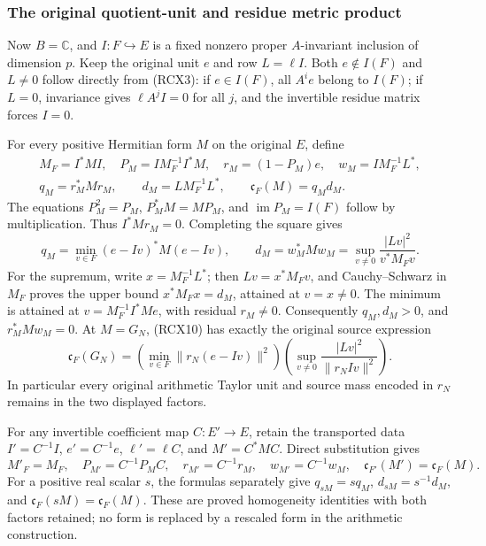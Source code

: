 \subsubsection{The original quotient-unit and residue metric product}

Now \(B=\mathbb C\), and \(I:F\hookrightarrow E\) is a fixed
nonzero proper \(A\)-invariant inclusion of dimension \(p\). Keep the
original unit \(e\) and row \(L=\ell I\). Both \(e\notin I(F)\)
and \(L\ne0\) follow directly from (RCX3): if \(e\in I(F)\), all
\(A^ie\) belong to \(I(F)\); if \(L=0\), invariance gives
\(\ell A^j I=0\) for all \(j\), and the invertible residue matrix
forces \(I=0\).

For every positive Hermitian form \(M\) on the original \(E\), define
\[
\begin{gathered}
 M_F=I^*MI,\quad P_M=I M_F^{-1}I^*M,\quad
 r_M=(1-P_M)e,\quad w_M=I M_F^{-1}L^*,\\
 q_M=r_M^*Mr_M,\qquad d_M=L M_F^{-1}L^*,\qquad
 \mathfrak c_F(M)=q_Md_M .
\end{gathered}\tag{RCX9}
\]
The equations \(P_M^2=P_M\), \(P_M^*M=MP_M\), and
\(\operatorname{im}P_M=I(F)\) follow by multiplication.
Thus \(I^*Mr_M=0\). Completing the square gives
\[
 q_M=\min_{v\in F}(e-Iv)^*M(e-Iv),\qquad
 d_M=w_M^*Mw_M
     =\sup_{v\ne0}\frac{|Lv|^2}{v^*M_Fv}.
 \tag{RCX10}
\]
For the supremum, write \(x=M_F^{-1}L^*\); then
\(Lv=x^*M_Fv\), and Cauchy--Schwarz in \(M_F\) proves the upper
bound \(x^*M_Fx=d_M\), attained at \(v=x\ne0\).
The minimum is attained at \(v=M_F^{-1}I^*Me\), with residual
\(r_M\ne0\). Consequently \(q_M,d_M>0\), and
\(r_M^*Mw_M=0\).
At \(M=G_N\), (RCX10) has exactly the original source expression
\[
 \mathfrak c_F(G_N)=
 \left(\min_{v\in F}\|r_N(e-Iv)\|^2\right)
 \left(\sup_{v\ne0}\frac{|Lv|^2}{\|r_NIv\|^2}\right).
 \tag{RCX11}
\]
In particular every original arithmetic Taylor unit and source mass
encoded in \(r_N\) remains in the two displayed factors.

For any invertible coefficient map \(C:E'\to E\), retain the transported
data \(I'=C^{-1}I\), \(e'=C^{-1}e\),
\(\ell'=\ell C\), and \(M'=C^*MC\). Direct substitution gives
\[
 M'_F=M_F,\quad P_{M'}=C^{-1}P_MC,\quad
 r_{M'}=C^{-1}r_M,\quad w_{M'}=C^{-1}w_M,\quad
 \mathfrak c_{F'}(M')=\mathfrak c_F(M).
 \tag{RCX12}
\]
For a positive real scalar \(s\), the formulas separately give
\(q_{sM}=s q_M\), \(d_{sM}=s^{-1}d_M\), and
\(\mathfrak c_F(sM)=\mathfrak c_F(M)\). These are proved
homogeneity identities with both factors retained; no form is replaced
by a rescaled form in the arithmetic construction.

